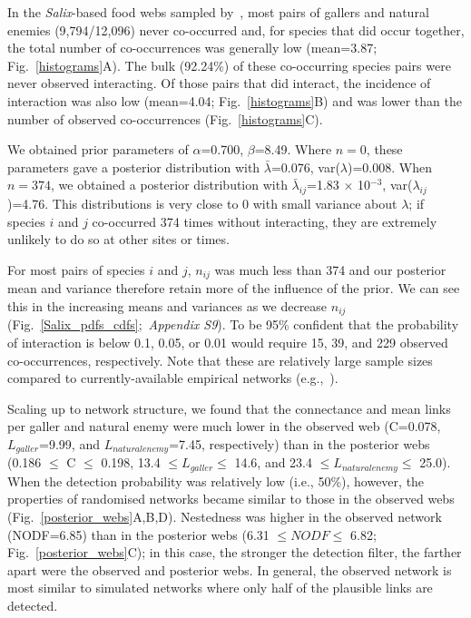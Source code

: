 \documentclass[12pt]{article}
\begin{document}
\begin{spacing}{2.0}
  In the \emph{Salix}-based food webs sampled by~\citet{Kopelke2017}, most pairs of gallers and natural enemies (9,794/12,096) never co-occurred and, for species that did occur together, the total number of co-occurrences was generally low (mean=3.87; Fig.~\ref{histograms}A). The bulk (92.24\%) of these co-occurring species pairs were never observed interacting. Of those pairs that did interact, the incidence of interaction was also low (mean=4.04; Fig.~\ref{histograms}B) and was lower than the number of observed co-occurrences (Fig.~\ref{histograms}C).


  We obtained prior parameters of $\alpha$=0.700, $\beta$=8.49. Where $n = 0$, these parameters gave a posterior distribution with $\bar\lambda$=0.076, var($\lambda$)=0.008. When $n = 374$, we obtained a posterior distribution with $\bar\lambda_{ij}$=1.83 $\times$ 10$^{-3}$, var($\lambda_{ij}$)=4.76. This distributions is very close to 0 with small variance about $\lambda$; if species $i$ and $j$ co-occurred 374 times without interacting, they   are extremely unlikely to do so at other sites or times. 


  For most pairs of species $i$ and $j$, $n_{ij}$ was much less than 374 and our posterior mean and variance therefore retain more of the influence of the prior. We can see this in the increasing means and variances as we decrease $n_{ij}$ (Fig.~\ref{Salix_pdfs_cdfs};~\emph{Appendix S9}). To be 95\% confident that the probability of interaction is below 0.1, 0.05, or 0.01 would require 15, 39, and 229 observed co-occurrences, respectively. Note that these are relatively large sample sizes compared to currently-available empirical networks (e.g.,~\citealp{Morris2014}).


  Scaling up to network structure, we found that the connectance and mean links per galler and natural enemy were much lower in the observed web (C=0.078, $L_{galler}$=9.99, and $L_{natural enemy}$=7.45, respectively) than in the posterior webs (0.186 $\leq$ C $\leq$ 0.198, 13.4 $\leq L_{galler} \leq$ 14.6, and 23.4 $\leq L_{natural enemy} \leq$ 25.0). When the detection probability was relatively low (i.e., 50\%), however, the properties of randomised networks became similar to those in the observed webs (Fig.~\ref{posterior_webs}A,B,D). Nestedness was higher in the observed network (NODF=6.85) than in the posterior webs (6.31 $\leq NODF \leq$ 6.82; Fig.~\ref{posterior_webs}C); in this case, the stronger the detection filter, the farther apart were the observed and posterior webs. In general, the observed network is most similar to simulated networks where only half of the plausible links are detected. 



\end{spacing}
\end{document}
